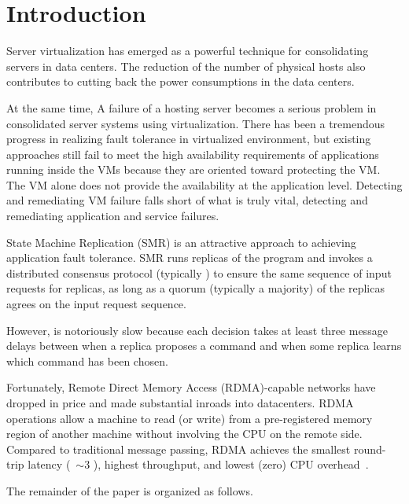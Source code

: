 \section{Introduction} \label{sec:intro}


Server virtualization has emerged as a powerful technique for consolidating servers in 
data centers. The reduction of the number of physical hosts also contributes to cutting 
back the power consumptions in the data centers.


At the same time, A failure of a hosting server becomes a serious problem in consolidated 
server systems using virtualization. There has been a tremendous progress in realizing fault 
tolerance in virtualized environment, but existing approaches still fail to meet the high 
availability requirements of applications running inside the VMs because they are oriented 
toward protecting the VM. The VM alone does not provide the availability at the application level. 
Detecting and remediating VM failure falls short of what is truly vital, detecting and remediating 
application and service failures.

State Machine Replication (SMR) is an attractive approach to achieving application fault tolerance. 
SMR runs replicas of the program and invokes a distributed consensus protocol 
(typically \paxos) to ensure the same sequence of input requests for replicas, as long as a 
quorum (typically a majority) of the replicas agrees on the input request sequence.

However, \paxos is notoriously slow because each decision takes at least 
three message delays between when a replica proposes a command and when some replica learns which 
command has been chosen.

Fortunately, Remote Direct Memory Access (RDMA)-capable networks have dropped in price and made 
substantial inroads into datacenters. RDMA operations allow a machine to read (or write) from a 
pre-registered memory region of another machine without involving the CPU on the remote side. 
Compared to traditional message passing, RDMA achieves the smallest round-trip latency 
(~$\sim$3 \us), highest throughput, and lowest (zero) CPU overhead~\cite{pilaf:usenix14}.


The remainder of the paper is organized as follows.
